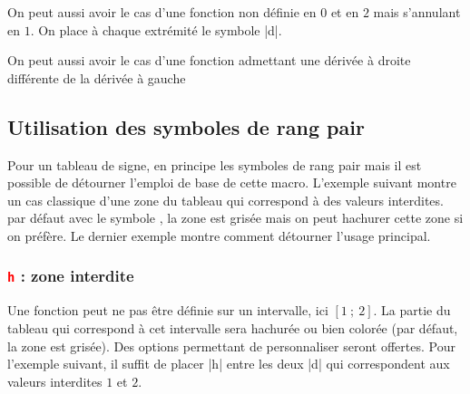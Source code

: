 On peut aussi avoir le cas d'une fonction  non définie en $0$ et en $2$ mais s'annulant en $1$. On place à chaque extrémité le symbole |d|.

\begin{tkzexample}[width=7cm,small]
\end{tkzexample}

On peut aussi avoir le cas d'une fonction admettant une dérivée à droite différente de la dérivée à gauche

\begin{tkzexample}[width=7cm,small]
\end{tkzexample}

\subsection{Utilisation des symboles de rang pair}

Pour un tableau de signe, en principe les symboles de rang pair mais il est possible de détourner l'emploi de base de cette macro. L'exemple suivant montre un cas classique d'une zone du tableau qui correspond à des valeurs interdites. par défaut avec le symbole , la zone est grisée mais on peut hachurer cette zone si on préfère.
Le dernier exemple montre comment détourner l'usage principal.

\subsubsection{\texttt{\textcolor{red}{h}} : zone interdite}

Une fonction peut ne pas être définie sur un intervalle, ici $[1~;~2]$. La partie du tableau qui correspond à cet intervalle sera hachurée ou bien colorée (par défaut, la zone est grisée). Des options permettant de personnaliser seront offertes. Pour l'exemple suivant, il suffit de placer |h| entre les deux |d| qui correspondent aux valeurs interdites $1$ et  $2$.

\begin{tkzexample}[width=8cm, small]
\end{tkzexample}

